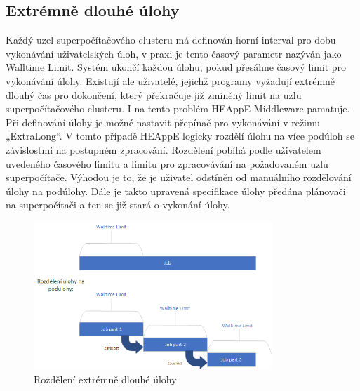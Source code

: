 \subsection{Extrémně dlouhé úlohy}
Každý uzel superpočítačového clusteru má definován horní interval pro dobu vykonávání uživatelských úloh, v praxi je tento časový parametr nazýván jako Walltime Limit. Systém ukončí každou úlohu, pokud přesáhne časový limit pro vykonávání úlohy. Existují ale uživatelé, jejichž programy vyžadují extrémně dlouhý čas pro dokončení, který překračuje již zmíněný limit na uzlu superpočítačového clusteru. I na tento problém HEAppE Middleware pamatuje. Při definování úlohy je možné nastavit přepínač pro vykonávání v režimu „ExtraLong“. V tomto případě HEAppE logicky rozdělí úlohu na více podúloh se závislostmi na postupném zpracování. Rozdělení pobíhá podle uživatelem uvedeného časového limitu a limitu pro zpracovávání na požadovaném uzlu superpočítače. Výhodou je to, že je uživatel odstíněn od manuálního rozdělování úlohy na podúlohy. Dále je takto upravená specifikace úlohy předána plánovači na superpočítači a ten se již stará o vykonání úlohy.

\hfill \break
\begin{figure}[h]
	\centering
	\includegraphics[width=0.8\textwidth]{Figures/job-decompose.png}
	\caption{Rozdělení extrémně dlouhé úlohy }
	\label{fig:rozdeleni-extra-long}
\end{figure}